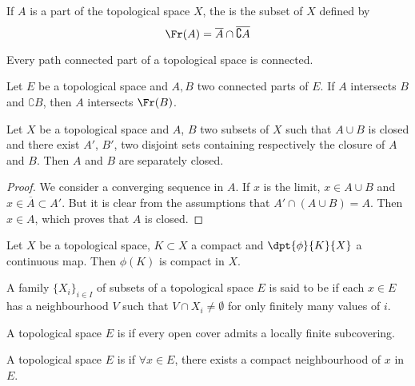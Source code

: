 If $A$ is a part of the topological space $X$, the  is the subset of $X$ defined by
\[
   \Fr(A)=\overline{A}\cap\overline{\complement A}
\]

\begin{lemma}
    Every path connected part of a topological space is connected.
\end{lemma}

\begin{theorem}
Let $E$ be a topological space and $A,B$ two connected parts of $E$. If $A$ intersects $B$ and $\complement B$, then $A$ intersects $\Fr(B)$.\label{tho:doine}
\end{theorem}


\begin{proposition}
Let $X$ be a topological space and $A$, $B$ two subsets of $X$ such that $A\cup B$ is closed and there exist $A'$, $B'$, two disjoint sets containing respectively the closure of $A$ and $B$. Then $A$ and $B$ are separately closed.\label{prop:sep_ferme}
\end{proposition}

\begin{proof}
We consider a converging sequence in $A$. If $x$ is the limit, $x\in A\cup B$ and $x\in\overline{A}\subset A'$. But it is clear from the assumptions that $A'\cap(A\cup B)=A$. Then $x\in A$, which proves that $A$ is closed.
\end{proof}

\begin{proposition}
    Let $X$ be a topological space, $K\subset X$ a compact and $\dpt{\phi}{K}{X}$ a continuous map. Then $\phi(K)$ is compact in $X$.
\end{proposition}

\begin{definition}
  A family $\{ X_i \}_{i\in I}$ of subsets of a topological space $E$ is said to be  if each $x\in E$ has a neighbourhood $V$ such that $V\cap X_i \neq \emptyset$ for only finitely many values of $i$.
\end{definition}


\begin{definition}	\label{DefParacompact}
A topological space $E$ is  if every open cover admits a locally finite subcovering.
\end{definition}


\begin{definition}
A topological space $E$ is  if $\forall x\in E$, there exists a compact neighbourhood of $x$ in $E$.
\end{definition}

